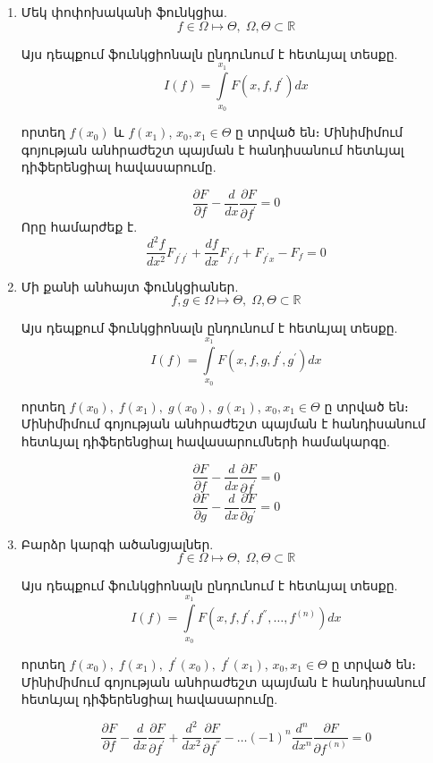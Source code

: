 \documentclass[fleqn, bachelor,subf,12pt,notitlepage]{article}
\begin{document}
\begin{enumerate}

\item Մեկ փոփոխականի ֆունկցիա.
$$f \in \Omega \mapsto \Theta, \; \Omega, \Theta \subset \mathbb{R}$$

\noindent Այս դեպքում ֆունկցիոնալն ընդունում է հետևյալ տեսքը.
$$I\left(f\right) = \int\limits_{x_0}^{x_{1}} F\left(x, f, f^{'}\right)dx$$

\noindent որտեղ $f(x_{0})$ և $f(x_{1})$, $x_{0}, x_{1} \in \Theta$ ը տրված են։
\noindent Մինիմիմում գոյության անհրաժեշտ պայման է հանդիսանում հետևյալ դիֆերենցիալ հավասարումը.

$$\dfrac{\partial F}{\partial f} - \dfrac{d}{dx}\dfrac{\partial F}{\partial f^{'}}=0$$
Որը համարժեք է.
$$\dfrac{d^{2}f}{dx^{2}}F_{f^{'}f^{'}}+\dfrac{df}{dx}F_{f^{'}f} + F_{f^{'}x}-F_{f}=0$$

\item Մի քանի անհայտ ֆունկցիաներ.
$$f,g \in \Omega \mapsto \Theta, \; \Omega, \Theta \subset \mathbb{R}$$

\noindent Այս դեպքում ֆունկցիոնալն ընդունում է հետևյալ տեսքը.
$$I\left(f\right) = \int\limits_{x_0}^{x_{1}} F\left(x, f, g, f^{'}, g^{'}\right)dx$$

\noindent որտեղ $f(x_{0}), \; f(x_{1}), \; g(x_{0}), \; g(x_{1})$, $x_{0}, x_{1} \in \Theta$ ը տրված են։
\noindent Մինիմիմում գոյության անհրաժեշտ պայման է հանդիսանում հետևյալ դիֆերենցիալ հավասարումների համակարգը.

$$\dfrac{\partial F}{\partial f} - \dfrac{d}{dx}\dfrac{\partial F}{\partial f^{'}}=0$$
$$\dfrac{\partial F}{\partial g} - \dfrac{d}{dx}\dfrac{\partial F}{\partial g^{'}}=0$$

\item Բարձր կարգի ածանցյալներ.
$$f \in \Omega \mapsto \Theta, \; \Omega, \Theta \subset \mathbb{R}$$

\noindent Այս դեպքում ֆունկցիոնալն ընդունում է հետևյալ տեսքը.
$$I\left(f\right) = \int\limits_{x_0}^{x_{1}} F\left(x, f, f^{'}, f^{''}, \dots, f^{(n)}\right)dx$$

\noindent որտեղ $f(x_{0}), \; f(x_{1}), \; f^{'}(x_{0}), \; f^{'}(x_{1})$, $x_{0}, x_{1} \in \Theta$ ը տրված են։
\noindent Մինիմիմում գոյության անհրաժեշտ պայման է հանդիսանում հետևյալ դիֆերենցիալ հավասարումը.

$$\dfrac{\partial F}{\partial f} - \dfrac{d}{dx}\dfrac{\partial F}{\partial f^{'}} + \dfrac{d^{2}}{dx^{2}}\dfrac{\partial F}{\partial f^{''}} - \dots (-1)^{n}\dfrac{d^{n}}{dx^{n}}\dfrac{\partial F}{\partial f^{(n)}}=0$$



\end{enumerate}
\end{document}
